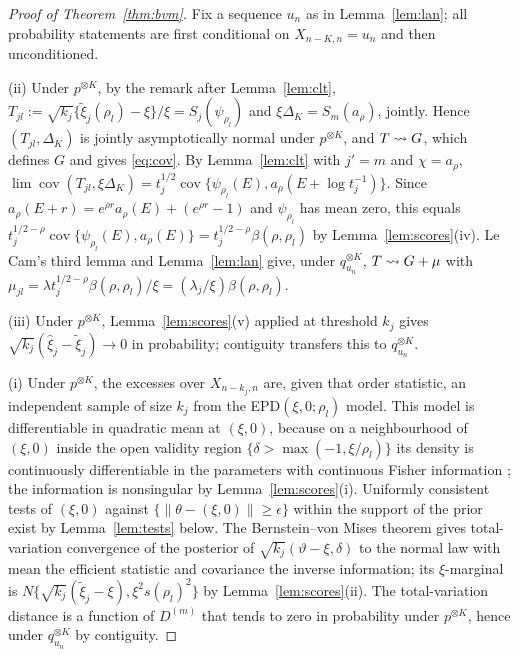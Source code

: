 \begin{proof}[Proof of Theorem~\ref{thm:bvm}]
Fix a sequence $u_n$ as in Lemma~\ref{lem:lan}; all probability statements are first conditional
on $X_{n-K,n}=u_n$ and then unconditioned.

(ii) Under $p^{\otimes K}$, by the remark after Lemma~\ref{lem:clt},
$T_{jl}:=\sqrt{k_j}\{\tilde\xi_j(\rho_l)-\xi\}/\xi=S_j(\psi_{\rho_l})$ and
$\xi\Delta_K=S_m(a_\rho)$, jointly. Hence $(T_{jl},\Delta_K)$ is jointly asymptotically normal under
$p^{\otimes K}$, and $T\rightsquigarrow G$, which defines $G$ and gives \eqref{eq:cov}. By Lemma~\ref{lem:clt}
with $j'=m$ and $\chi=a_\rho$, $\lim\operatorname{cov}(T_{jl},\xi\Delta_K)=t_j^{1/2}
\operatorname{cov}\{\psi_{\rho_l}(E),a_\rho(E+\log t_j^{-1})\}$. Since
$a_\rho(E+r)=e^{\rho r}a_\rho(E)+(e^{\rho r}-1)$ and $\psi_{\rho_l}$ has mean zero, this equals
$t_j^{1/2-\rho}\operatorname{cov}\{\psi_{\rho_l}(E),a_\rho(E)\}=t_j^{1/2-\rho}\beta(\rho,\rho_l)$
by Lemma~\ref{lem:scores}(iv). Le Cam's third lemma \citep[Example~6.7]{vandervaart1998} and
Lemma~\ref{lem:lan} give, under $q_{u_n}^{\otimes K}$, $T\rightsquigarrow G+\mu$ with
$\mu_{jl}=\lambda t_j^{1/2-\rho}\beta(\rho,\rho_l)/\xi=(\lambda_j/\xi)\beta(\rho,\rho_l)$.

(iii) Under $p^{\otimes K}$, Lemma~\ref{lem:scores}(v) applied at threshold $k_j$ gives
$\sqrt{k_j}(\hat\xi_j-\tilde\xi_j)\to0$ in probability; contiguity transfers this to
$q_{u_n}^{\otimes K}$.

(i) Under $p^{\otimes K}$, the excesses over $X_{n-k_j,n}$ are, given that order statistic, an
independent sample of size $k_j$ from the EPD$(\xi,0;\rho_l)$ model. This model is
differentiable in quadratic mean at $(\xi,0)$, because on a neighbourhood of $(\xi,0)$ inside the
open validity region $\{\delta>\max(-1,\xi/\rho_l)\}$ its density is continuously
differentiable in the parameters with continuous Fisher information
\citep[Lemma~7.6]{vandervaart1998}; the information is nonsingular by
Lemma~\ref{lem:scores}(i). Uniformly consistent tests of $(\xi,0)$ against $\{\|\theta-(\xi,0)\|\ge\epsilon\}$ within the
support of the prior exist by Lemma~\ref{lem:tests} below. The Bernstein--von Mises theorem
\citep[Theorem~10.1]{vandervaart1998} gives total-variation convergence of the posterior of
$\sqrt{k_j}(\vartheta-\xi,\delta)$ to the normal law with mean the efficient statistic and
covariance the inverse information; its $\xi$-marginal is $N\{\sqrt{k_j}(\tilde\xi_j-\xi),
\xi^2s(\rho_l)^2\}$ by Lemma~\ref{lem:scores}(ii). The total-variation distance is a function of
$D^{(m)}$ that tends to zero in probability under $p^{\otimes K}$, hence under
$q_{u_n}^{\otimes K}$ by contiguity. \qedhere
\end{proof}

